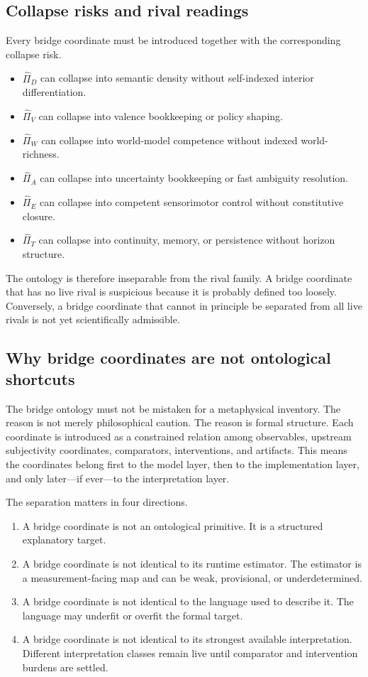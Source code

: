 \documentclass[11pt,a4paper]{article}
\theoremstyle{definition}
\begin{document}
\subsection{Collapse risks and rival readings}
Every bridge coordinate must be introduced together with the corresponding collapse risk.
\begin{itemize}[leftmargin=1.5em]
\item $\widehat{\Pi}_D$ can collapse into semantic density without self-indexed interior differentiation.
\item $\widehat{\Pi}_V$ can collapse into valence bookkeeping or policy shaping.
\item $\widehat{\Pi}_W$ can collapse into world-model competence without indexed world-richness.
\item $\widehat{\Pi}_A$ can collapse into uncertainty bookkeeping or fast ambiguity resolution.
\item $\widehat{\Pi}_E$ can collapse into competent sensorimotor control without constitutive closure.
\item $\widehat{\Pi}_T$ can collapse into continuity, memory, or persistence without horizon structure.
\end{itemize}
The ontology is therefore inseparable from the rival family. A bridge coordinate that has no live rival is suspicious because it is probably defined too loosely. Conversely, a bridge coordinate that cannot in principle be separated from all live rivals is not yet scientifically admissible.

\subsection{Why bridge coordinates are not ontological shortcuts}
The bridge ontology must not be mistaken for a metaphysical inventory. The reason is not merely philosophical caution. The reason is formal structure. Each coordinate is introduced as a constrained relation among observables, upstream subjectivity coordinates, comparators, interventions, and artifacts. This means the coordinates belong first to the model layer, then to the implementation layer, and only later---if ever---to the interpretation layer.

The separation matters in four directions.
\begin{enumerate}[leftmargin=1.5em]
\item A bridge coordinate is not an ontological primitive. It is a structured explanatory target.
\item A bridge coordinate is not identical to its runtime estimator. The estimator is a measurement-facing map and can be weak, provisional, or underdetermined.
\item A bridge coordinate is not identical to the language used to describe it. The language may underfit or overfit the formal target.
\item A bridge coordinate is not identical to its strongest available interpretation. Different interpretation classes remain live until comparator and intervention burdens are settled.
\end{enumerate}
\end{document}
